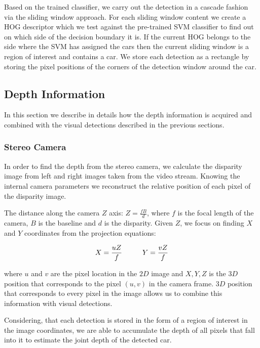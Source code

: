 Based on the trained classifier, we carry out the detection in a cascade
fashion via the sliding window approach. For each sliding window content we
create a HOG descriptor which we test against the pre-trained SVM classifier
to find out on which side of the decision boundary it is. If the current HOG
belongs to the side where the SVM has assigned the cars then the current
sliding window is a region of interest and contains a car. We store each
detection as a rectangle by storing the pixel positions of the corners of the
detection window around the car.


\subsection{Depth Information}\label{sub:depth_information}

In this section we describe in details how the depth information is acquired
and combined with the visual detections described in the previous sections.

\subsubsection{Stereo Camera}\label{ssub:stereo_camera}

In order to find the depth from the stereo camera, we calculate the disparity
image from left and right images taken from the video stream. Knowing the
internal camera parameters we reconstruct the relative position of each pixel
of the disparity image.

The distance along the camera $Z$ axis: $Z = \frac{fB}{d}$, where $f$ is the
focal length of the camera, $B$ is the baseline and $d$ is the disparity.
Given $Z$, we focus on finding $X$ and $Y$ coordinates from the projection
equations:

\begin{equation}
X = \frac{uZ}{f}
\hspace{10 mm}
Y = \frac{vZ}{f}
\end{equation}

where $u$ and $v$ are the pixel location in the $2D$ image and $X, Y, Z$ is
the $3D$ position that corresponds to the pixel $(u,v)$ in the camera frame.
$3D$ position that corresponds to every pixel in the image allows us to
combine this information with visual detections.

Considering, that each detection is stored in the form of a region of interest
in the image coordinates, we are able to accumulate the depth of all pixels
that fall into it to estimate the joint depth of the detected car.

